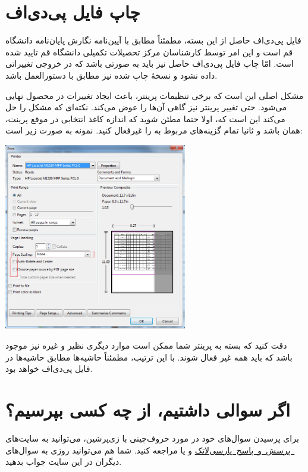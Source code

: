         


    \section{چاپ فایل پی‌دی‌اف}
    فایل پی‌دی‌اف حاصل از این بسته، مطمئناً مطابق با آیین‌نامه نگارش پایان‌نامه دانشگاه قم
    است و این امر توسط کارشناسان مرکز تحصیلات تکمیلی دانشگاه قم تایید شده است.
    امّا چاپ فایل پی‌دی‌اف حاصل نیز باید به صورتی باشد که در خروجی تغییراتی داده نشود و نسخۀ
    چاپ شده نیز مطابق با دستورالعمل باشد. 

     مشکل اصلی این است که برخی تنظیمات پرینتر، باعث ایجاد تغییرات در محصول نهایی می‌شود.
      حتی تغییر پرینتر نیز گاهی آن‌ها را عوض می‌کند. 
     نکته‌ای که مشکل را حل می‌کند این است که، اولا حتما مطئن شوید 
     که اندازه کاغذ انتخابی در موقع پرینت، همان  باشد و ثانیا تمام گزینه‌های مربوط 
     به   را غیرفعال کنید. نمونه به صورت زیر است:

     {\centerline{\includegraphics[width=0.6\textwidth]{Print-PDF}}}
     
    دقت کنید که بسته به پرینتر شما ممکن است موارد دیگری نظیر   و غیره نیز 
    موجود باشد که باید همه غیر فعال شوند.
    با این ترتیب، مطمئناً حاشیه‌ها مطابق حاشیه‌ها در فایل پی‌دی‌اف خواهد بود.
    \section{اگر سوالی داشتیم، از چه کسی  بپرسیم؟}
    برای پرسیدن سوال‌های خود در مورد حروف‌چینی با زی‌پرشین،  می‌توانید به سایت‌های 
     \hbox{\href{http://qa.parsilatex.com}{ پرسش و پاسخ پارسی‌لاتک}}%
    و یا 
    \hbox{\href{https://tex.stackexchange.com/questions}{}}%
    مراجعه کنید. شما هم می‌توانید روزی به سوال‌های دیگران در این سایت جواب بدهید.
        

